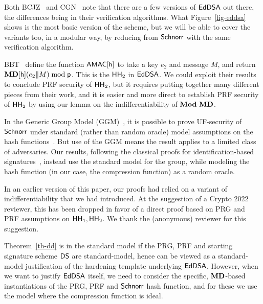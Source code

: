 
 
 Both BCJZ~\cite{SP:BCJZ21} and CGN~\cite{10.1007/978-3-030-64357-7_4} note that there are a few versions of $\mathsf{EdDSA}$ out there, the differences being in their verification algorithms. What Figure~\ref{fig-eddsa} shows is the most basic version of the scheme, but we will be able to cover the variants too, in a modular way, by reducing from $\mathsf{Schnorr}$ with the same verification algorithm.

BBT~\cite{EC:BelBerTes16} define the function $\mathsf{AMAC}[\mathsf{h}]$ to take a key $e_2$ and message $M$, and return $\mathbf{MD}[\mathsf{h}](e_2\|M)\bmod\mathsf{p}$. This is the $\mathsf{HH}_2$ in $\mathsf{EdDSA}$. We could exploit their results to conclude PRF security of $\mathsf{HH}_2$, but it requires putting together many different pieces from their work, and it is easier and more direct to establish PRF security of $\mathsf{HH}_2$ by using our lemma on the indifferentiability of $\mathbf{Mod\mbox{-}MD}$.

In the Generic Group Model (GGM)~\cite{EC:Shoup97}, it is possible to prove UF-security of $\mathsf{Schnorr}$ under standard (rather than random oracle) model assumptions on the hash functions~\cite{neven2009hash,C:CLMQ21}. But use of the GGM means the result applies to a limited class of adversaries. Our results, following the classical proofs for identification-based signatures~\cite{JC:PoiSte00,C:OhtOka98,EC:AABN02,C:KilMasPan16}, instead use the standard model for the group, while modeling the hash function (in our case, the compression function) as a random oracle. 

In an earlier version of this paper, our proofs had relied on a variant of indifferentiability that we had introduced. At the suggestion of a Crypto 2022 reviewer, this has been dropped in favor of a direct proof based on PRG and PRF assumptions on $\mathsf{HH}_1,\mathsf{HH}_2$. We thank the (anonymous) reviewer for this suggestion.

Theorem~\ref{th-dd} is in the standard model if the PRG, PRF and starting signature scheme $\mathsf{DS}$ are standard-model, hence can be viewed as a standard-model justification of the hardening template underlying $\mathsf{EdDSA}$. However, when we want to justify $\mathsf{EdDSA}$ itself, we need to consider the specific, $\mathbf{MD}$-based instantiations of the PRG, PRF and $\mathsf{Schnorr}$ hash function, and for these we use the model where the compression function is ideal.

